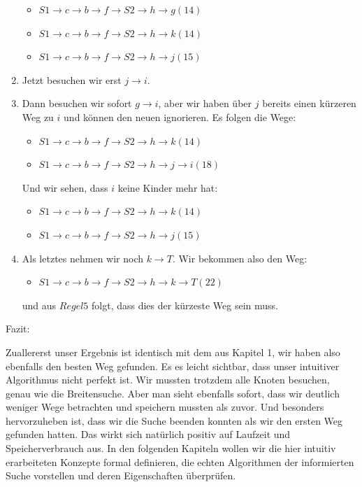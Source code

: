 \begin{enumerate}
\begin{itemize}
		\item $S1\rightarrow c\rightarrow b\rightarrow f\rightarrow S2\rightarrow h\rightarrow g(14)$
		\item $S1\rightarrow c\rightarrow b\rightarrow f\rightarrow S2\rightarrow h\rightarrow k(14)$
		\item $S1\rightarrow c\rightarrow b\rightarrow f\rightarrow S2\rightarrow h\rightarrow j(15)$
	\end{itemize}	\item Jetzt besuchen wir erst $j\rightarrow i$. 
	\item Dann besuchen wir sofort $g\rightarrow i$, aber wir haben \"uber $j$ bereits einen k\"urzeren Weg zu $i$ und k\"onnen den neuen ignorieren. Es folgen die Wege:
	\begin{itemize}
		\item $S1\rightarrow c\rightarrow b\rightarrow f\rightarrow S2\rightarrow h\rightarrow k(14)$
		\item $S1\rightarrow c\rightarrow b\rightarrow f\rightarrow S2\rightarrow h\rightarrow j\rightarrow i(18)$
	\end{itemize}
	Und wir sehen, dass $i$ keine Kinder mehr hat:
	\begin{itemize}
		\item $S1\rightarrow c\rightarrow b\rightarrow f\rightarrow S2\rightarrow h\rightarrow k(14)$
		\item $S1\rightarrow c\rightarrow b\rightarrow f\rightarrow S2\rightarrow h\rightarrow j(15)$
	\end{itemize}
	\item Als letztes nehmen wir noch $k \rightarrow  T$. Wir bekommen also den Weg:
	\begin{itemize}
		\item $S1 \rightarrow  c \rightarrow  b \rightarrow  f \rightarrow  S2 \rightarrow  h \rightarrow  k \rightarrow  T (22)$ 
	\end{itemize}
	und aus $Regel 5$ folgt, dass dies der k\"urzeste Weg sein muss. 
\end{enumerate}
Fazit:

Zuallererst unser Ergebnis ist identisch mit dem aus Kapitel 1, wir haben also ebenfalls den besten Weg gefunden.  Es es leicht sichtbar, dass unser intuitiver Algorithmus nicht perfekt ist. Wir mussten trotzdem alle Knoten besuchen, genau wie die Breitensuche. Aber man sieht ebenfalls sofort, dass wir deutlich weniger Wege betrachten und speichern mussten als zuvor. Und besonders hervorzuheben ist, dass wir die Suche beenden konnten als wir den ersten Weg gefunden hatten. Das wirkt sich nat\"urlich positiv auf Laufzeit und Speicherverbrauch aus. In den folgenden Kapiteln wollen wir die hier intuitiv erarbeiteten Konzepte formal definieren, die echten Algorithmen der informierten Suche vorstellen und deren Eigenschaften \"uberpr\"ufen. 
 
